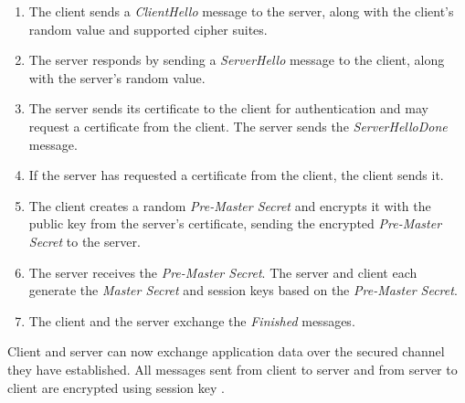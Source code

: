 \documentclass[
  digital, %
  notable,   %
  lof,     %
  lot,     %
]{fithesis3}
\begin{document}
\begin{enumerate}
\item The client sends a \textit{ClientHello} message to the server, along with the client's random value and supported cipher suites.
\item The server responds by sending a \textit{ServerHello} message to the client, along with the server's random value.
\item The server sends its certificate to the client for authentication and may request a certificate from the client. The server sends the \textit{ServerHelloDone} message.
\item If the server has requested a certificate from the client, the client sends it.
\item The client creates a random \textit{Pre-Master Secret} and encrypts it with the public key from the server's certificate, sending the encrypted \textit{Pre-Master Secret} to the server.
\item The server receives the \textit{Pre-Master Secret}. The server and client each generate the \textit{Master Secret} and session keys based on the \textit{Pre-Master Secret}.
\item The client and the server exchange the \textit{Finished} messages.
\end{enumerate}

Client and server can now exchange application data over the secured channel they have established. All messages sent from client to server and from server to client are encrypted using session key \cite{handshakeprotocol}.
\end{document}
